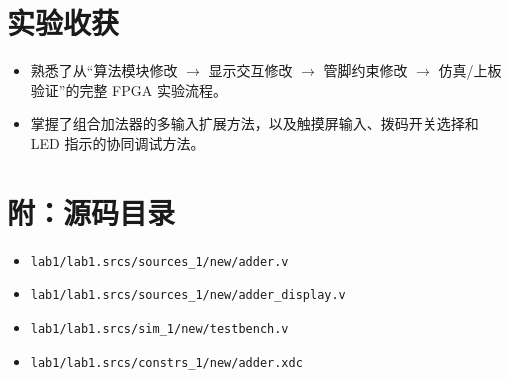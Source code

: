 \documentclass{article}
\begin{document}
\section{实验收获}
\begin{itemize}
\item 熟悉了从“算法模块修改 $\rightarrow$ 显示交互修改 $\rightarrow$ 管脚约束修改 $\rightarrow$ 仿真/上板验证”的完整 FPGA 实验流程。
\item 掌握了组合加法器的多输入扩展方法，以及触摸屏输入、拨码开关选择和 LED 指示的协同调试方法。
\end{itemize}

\section{附：源码目录}
\begin{itemize}
\item \verb|lab1/lab1.srcs/sources_1/new/adder.v|
\item \verb|lab1/lab1.srcs/sources_1/new/adder_display.v|
\item \verb|lab1/lab1.srcs/sim_1/new/testbench.v|
\item \verb|lab1/lab1.srcs/constrs_1/new/adder.xdc|
\end{itemize}
\end{document}
